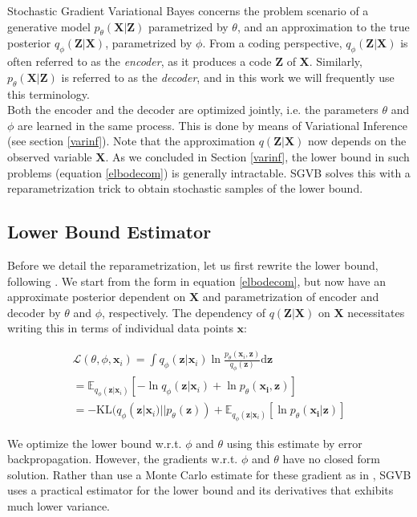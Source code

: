 \documentclass{report}
\begin{document}
Stochastic Gradient Variational Bayes concerns the problem scenario of a generative model $p_\theta(\mathbf{X}|\mathbf{Z})$ parametrized by $\theta$, and an approximation to the true posterior $q_\phi(\mathbf{Z}|\mathbf{X})$, parametrized by $\phi$. From a coding perspective, $q_\phi(\mathbf{Z}|\mathbf{X})$ is often referred to as the \textit{encoder}, as it produces a code $\mathbf{Z}$ of $\mathbf{X}$. Similarly, $p_\theta(\mathbf{X}|\mathbf{Z})$ is referred to as the \textit{decoder}, and in this work we will frequently use this terminology. \\
Both the encoder and the decoder are optimized jointly, i.e. the parameters $\theta$ and $\phi$ are learned in the same process. This is done by means of Variational Inference (see section \ref{varinf}). Note that the approximation $q(\mathbf{Z}|\mathbf{X})$ now depends on the observed variable $\mathbf{X}$. As we concluded in Section \ref{varinf}, the lower bound in such problems (equation \ref{elbodecom}) is generally intractable. SGVB solves this with a reparametrization trick to obtain stochastic samples of the lower bound. 

\subsection{Lower Bound Estimator}\label{sgvbest}
Before we detail the reparametrization, let us first rewrite the lower bound, following \cite{kingma2013auto}. We start from the form in equation \ref{elbodecom}, but now have an approximate posterior dependent on $\mathbf{X}$ and parametrization of encoder and decoder by $\theta$ and $\phi$, respectively. The dependency of $q(\mathbf{Z}|\mathbf{X})$ on $\mathbf{X}$ necessitates writing this in terms of individual data points $\mathbf{x}$:

\begin{align}
\mathcal{L}(\theta, \phi, \mathbf{x}_i) = \int q_\phi(\mathbf{z}|\mathbf{x}_i) \ln \frac{p_\theta(\mathbf{x}_i,\mathbf{{z}})}{q_\phi(\mathbf{z})}\text{d}\mathbf{z} \\
= \mathbb{E}_{q_\phi(\mathbf{z}|\mathbf{x}_i)}[-\ln q_\phi (\mathbf{z}|\mathbf{x}_i)+\ln p_\theta (\mathbf{x_i,z})] \\
= -\text{KL}(q_\phi(\mathbf{z}|\mathbf{x}_i)||p_\theta(\mathbf{{z}})) + \mathbb{E}_{q_\phi(\mathbf{z}|\mathbf{x}_i)}[\ln p_\theta (\mathbf{x_i|z})]
\end{align}

We optimize the lower bound w.r.t. $\phi$ and $\theta$ using this estimate by error backpropagation. However, the gradients w.r.t. $\phi$ and $\theta$ have no closed form solution. Rather than use a Monte Carlo estimate for these gradient as in \cite{paisley2012variational}, SGVB uses a practical estimator for the lower bound and its derivatives that exhibits much lower variance.  
\end{document}
